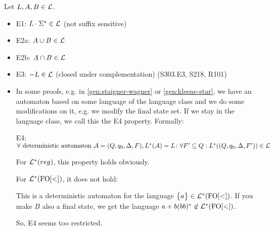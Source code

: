 Let $L,A,B \in \mathcal{L}$.
\begin{itemize}
\item E1: $L \cdot \Sigma^* \in \mathcal{L}$ (not suffix sensitive)
\item E2a: $A \cup B \in \mathcal{L}$
\item E2b: $A \cap B \in \mathcal{L}$
\item E3: $- L \in \mathcal{L}$ (closed under complementation) (S303.E3, S218, R101)

\item
In some proofs, e.g. in \ref{gen:staigner-wagner} or \ref{gen:kleene-star}, we have an automaton based on some language of the language class and we do some modifications on it, e.g. we modify the final state set. If we stay in the language class, we call this the E4 property. Formally:

E4: $\forall \text{ deterministic automaton } \mathcal{A} = (Q,q_0,\Delta,F), L^*(\mathcal{A}) = L \colon \forall F' \subseteq Q: L^*((Q,q_0,\Delta,F')) \in \mathcal{L}$

For $\mathcal{L}^*(reg)$, this property holds obviously.

For $\mathcal{L}^*(\mathrm{FO[<]})$, it does not hold:

  
This is a deterministic automaton for the language $\Set{a} \in \Lang^*(\mathrm{FO[<]})$. If you make $B$ also a final state, we get the language $a + b(bb)^* \not\in \mathcal{L}^*(\mathrm{FO[<]})$.

So, E4 seems too restricted.


\end{itemize}
